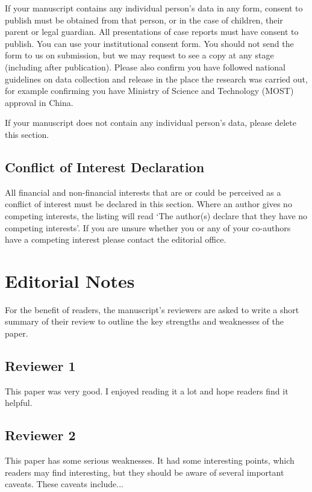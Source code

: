 \documentclass[a4paper,num-refs]{ehi-journals}
\begin{document}
If your manuscript contains any individual person's data in any form, consent to publish must be obtained from that person, or in the case of children, their parent or legal guardian. All presentations of case reports must have consent to publish. You can use your institutional consent form. You should not send the form to us on submission, but we may request to see a copy at any stage (including after publication). Please also confirm you have followed national guidelines on data collection and release in the place the research was carried out, for example confirming you have Ministry of Science and Technology (MOST) approval in China.

If your manuscript does not contain any individual person's data, please delete this section.

\subsection{Conflict of Interest Declaration}

All financial and non-financial interests that are or could be perceived as a conflict of interest must be declared in this section. Where an author gives no competing interests, the listing will read `The author(s) declare that they have no competing interests'. If you are unsure whether you or any of your co-authors have a competing interest please contact the editorial office.

\section{Editorial Notes}

For the benefit of readers, the manuscript's reviewers are asked to write a short summary of their review to outline the key strengths and weaknesses of the paper.

\subsection{Reviewer 1}

This paper was very good. I enjoyed reading it a lot and hope readers find it helpful.

\subsection{Reviewer 2}

This paper has some serious weaknesses. It had some interesting points, which readers may find interesting, but they should be aware of several important caveats. These caveats include...
\end{document}
